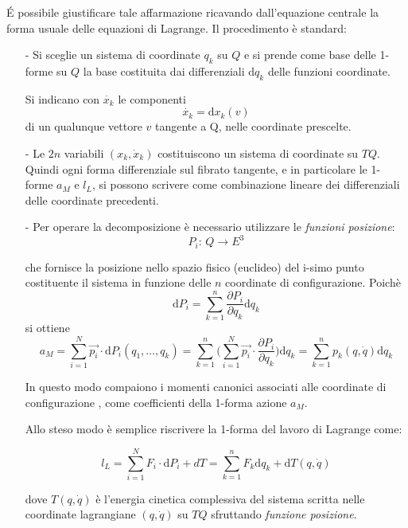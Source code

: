 \documentclass[11pt]{report}
\theoremstyle{plain}
\theoremstyle{definition}
\theoremstyle{remark}
\begin{document}
É possibile giustificare tale affarmazione ricavando dall'equazione centrale la forma usuale delle equazioni di Lagrange. Il procedimento è standard:
\begin{itemize}
\item[-] Si sceglie un sistema di coordinate $q_{k}$ su $Q$ e si prende come base delle 1-forme su $Q$ la base costituita dai differenziali $\textrm{d} q_{k}$ delle funzioni coordinate.

Si indicano con $\dot{x_{k}}$ le componenti
$$ \dot{x_{k}} = \textrm{d}x_{k}(v)$$ di un qualunque vettore $v$ tangente a Q, nelle coordinate prescelte.

\item[-] Le $2n$ variabili $(x_{k}, \dot{x}_{k}) $ costituiscono un sistema di coordinate su $TQ$. Quindi ogni forma differenziale sul fibrato tangente, e in particolare le 1-forme $a_{M}$ e $l_{L}$, si possono scrivere come combinazione lineare dei differenziali delle coordinate precedenti.

\item[-] Per operare la decomposizione è necessario utilizzare le \emph{funzioni posizione}: $$P_{i}: \, Q \rightarrow E^{3} $$

che fornisce la posizione nello spazio fisico (euclideo) del i-simo punto costituente il sistema in funzione delle $n$ coordinate di configurazione.
Poichè
$$\textrm{d}P_{i} = \sum_{k=1}^{n} \dfrac{\partial P_{i}}{\partial q_{k}} \textrm{d} q_{k} $$
si ottiene 
\begin{displaymath}
a_{M} = \sum_{i=1}^{N} \vec{p_{i}} \cdot \textrm{d}P_{i}(q_{1},\ldots , q_{k}) = \sum_{k=1}^{n} \bigr( \sum_{i=1}^{N} \vec{p_{i}} \cdot \dfrac{\partial P_{i}}{\partial q_{k}} \bigr) \textrm{d} q_{k} = \sum_{k=1}^{n} p_{k} ( q, \dot{q}) \textrm{d} q_{k}
\end{displaymath}

In questo modo compaiono i momenti canonici associati alle coordinate di configurazione , come coefficienti della 1-forma azione $a_{M}$.

Allo steso modo è semplice riscrivere la 1-forma del lavoro di Lagrange come:

\begin{displaymath}
l_{L} = \sum_{i=1}^{N} F_{i}\cdot \textrm{d}P_{i} + dT = \sum_{k=1}^{n} F_{k} \textrm{d} q_{k} + \textrm{d}T(q, \dot{q})
\end{displaymath}

dove $ T(q, \dot{q})$ è l'energia cinetica complessiva del sistema scritta nelle coordinate lagrangiane $(q, \dot{q})$ su $TQ$ sfruttando \emph{funzione posizione}.


\end{itemize}
\end{document}
